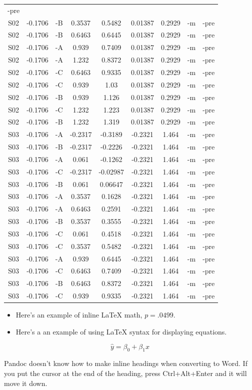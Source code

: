 \documentclass[man,longtable,noextraspace,floatsintext]{apa6}
\begin{document}
\begin{longtable}[]{@{}ccccccccc@{}}
-pre\tabularnewline
S02 & -0.1706 & -B & 0.3537 & 0.5482 & 0.01387 & 0.2929 & -m &
-pre\tabularnewline
S02 & -0.1706 & -B & 0.6463 & 0.6445 & 0.01387 & 0.2929 & -m &
-pre\tabularnewline
S02 & -0.1706 & -A & 0.939 & 0.7409 & 0.01387 & 0.2929 & -m &
-pre\tabularnewline
S02 & -0.1706 & -A & 1.232 & 0.8372 & 0.01387 & 0.2929 & -m &
-pre\tabularnewline
S02 & -0.1706 & -C & 0.6463 & 0.9335 & 0.01387 & 0.2929 & -m &
-pre\tabularnewline
S02 & -0.1706 & -C & 0.939 & 1.03 & 0.01387 & 0.2929 & -m &
-pre\tabularnewline
S02 & -0.1706 & -B & 0.939 & 1.126 & 0.01387 & 0.2929 & -m &
-pre\tabularnewline
S02 & -0.1706 & -C & 1.232 & 1.223 & 0.01387 & 0.2929 & -m &
-pre\tabularnewline
S02 & -0.1706 & -B & 1.232 & 1.319 & 0.01387 & 0.2929 & -m &
-pre\tabularnewline
S03 & -0.1706 & -A & -0.2317 & -0.3189 & -0.2321 & 1.464 & -m &
-pre\tabularnewline
S03 & -0.1706 & -B & -0.2317 & -0.2226 & -0.2321 & 1.464 & -m &
-pre\tabularnewline
S03 & -0.1706 & -A & 0.061 & -0.1262 & -0.2321 & 1.464 & -m &
-pre\tabularnewline
S03 & -0.1706 & -C & -0.2317 & -0.02987 & -0.2321 & 1.464 & -m &
-pre\tabularnewline
S03 & -0.1706 & -B & 0.061 & 0.06647 & -0.2321 & 1.464 & -m &
-pre\tabularnewline
S03 & -0.1706 & -A & 0.3537 & 0.1628 & -0.2321 & 1.464 & -m &
-pre\tabularnewline
S03 & -0.1706 & -A & 0.6463 & 0.2591 & -0.2321 & 1.464 & -m &
-pre\tabularnewline
S03 & -0.1706 & -B & 0.3537 & 0.3555 & -0.2321 & 1.464 & -m &
-pre\tabularnewline
S03 & -0.1706 & -C & 0.061 & 0.4518 & -0.2321 & 1.464 & -m &
-pre\tabularnewline
S03 & -0.1706 & -C & 0.3537 & 0.5482 & -0.2321 & 1.464 & -m &
-pre\tabularnewline
S03 & -0.1706 & -A & 0.939 & 0.6445 & -0.2321 & 1.464 & -m &
-pre\tabularnewline
S03 & -0.1706 & -C & 0.6463 & 0.7409 & -0.2321 & 1.464 & -m &
-pre\tabularnewline
S03 & -0.1706 & -B & 0.6463 & 0.8372 & -0.2321 & 1.464 & -m &
-pre\tabularnewline
S03 & -0.1706 & -C & 0.939 & 0.9335 & -0.2321 & 1.464 & -m &
-pre\tabularnewline
\bottomrule
\end{longtable}

\begin{itemize}
\item
  Here's an example of inline LaTeX math, \(p=.0499\).
\item
  Here's a an example of using LaTeX syntax for displaying equations.
\end{itemize}

\[
\hat{y} = \beta_0 + \beta_1 x
\]

Pandoc doesn't know how to make inline headings when converting to Word.
If you put the cursor at the end of the heading, press Ctrl+Alt+Enter
and it will move it down.
\end{document}
